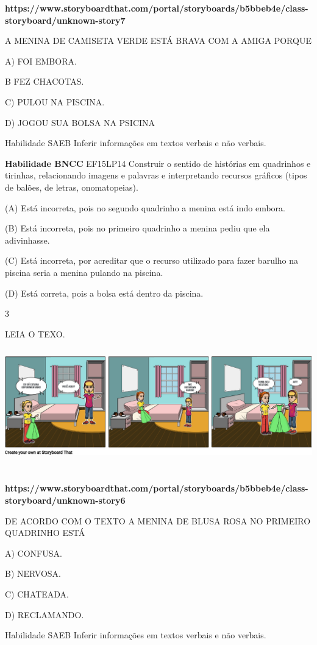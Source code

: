\begin{escola}
\textbf{https://www.storyboardthat.com/portal/storyboards/b5bbeb4e/class-storyboard/unknown-story7}

A MENINA DE CAMISETA VERDE ESTÁ BRAVA COM A AMIGA PORQUE

A) FOI EMBORA.

B FEZ CHACOTAS.

C) PULOU NA PISCINA.

D) JOGOU SUA BOLSA NA PSICINA

Habilidade SAEB Inferir informações em textos verbais e não verbais.

\textbf{Habilidade BNCC} EF15LP14 Construir o sentido de histórias em
quadrinhos e tirinhas, relacionando imagens e palavras e interpretando
recursos gráficos (tipos de balões, de letras, onomatopeias).

(A) Está incorreta, pois no segundo quadrinho a menina está indo embora.

(B) Está incorreta, pois no primeiro quadrinho a menina pediu que ela
adivinhasse.

(C) Está incorreta, por acreditar que o recurso utilizado para fazer
barulho na piscina seria a menina pulando na piscina.

(D) Está correta, pois a bolsa está dentro da
piscina.\protect\hypertarget{_heading=h.tt4s01xrdwwn}{}{}

\num{3}

LEIA O
TEXO.\includegraphics[width=6.07986in,height=2.24583in]{media/image182.png}

\textbf{https://www.storyboardthat.com/portal/storyboards/b5bbeb4e/class-storyboard/unknown-story6}

DE ACORDO COM O TEXTO A MENINA DE BLUSA ROSA NO PRIMEIRO QUADRINHO ESTÁ

A) CONFUSA.

B) NERVOSA.

C) CHATEADA.

D) RECLAMANDO.

Habilidade SAEB Inferir informações em textos verbais e não verbais.


\end{escola}

